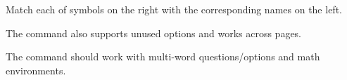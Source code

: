 \documentclass{exam}
\begin{document}
\begin{questions}
  \question
  Match each of symbols on the right with the corresponding names on the left.


  The command also supports unused options and works across pages.


  The command should work with multi-word questions/options and math environments.

\end{questions}
\end{document}
